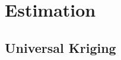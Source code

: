 \documentclass[12pt]{article}
\newcommand{\0}{\mathbf{0}}
\begin{document}
\endgroup

\section{Estimation}



\subsection{Universal Kriging}
\end{document}
